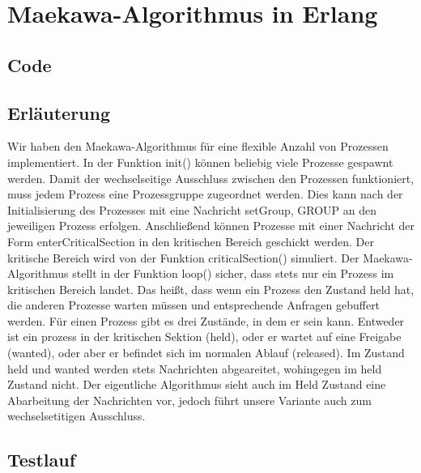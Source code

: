 \documentclass[a4paper,9pt]{article}
\begin{document}
\section{Maekawa-Algorithmus in Erlang}
\subsection{Code}



\vspace{2cm}
\subsection{Erläuterung}
Wir haben den Maekawa-Algorithmus für eine flexible Anzahl von Prozessen implementiert. In der Funktion init() können beliebig viele Prozesse gespawnt werden. Damit der wechselseitige Ausschluss zwischen den Prozessen funktioniert, muss jedem Prozess eine Prozessgruppe zugeordnet werden. Dies kann nach der Initialisierung des Prozesses mit eine Nachricht {setGroup, GROUP} an den jeweiligen Prozess erfolgen. Anschließend können Prozesse mit einer Nachricht der Form enterCriticalSection in den kritischen Bereich geschickt werden. Der kritische Bereich wird von der Funktion criticalSection() simuliert.
Der Maekawa-Algorithmus stellt in der Funktion loop() sicher, dass stets nur ein Prozess im kritischen Bereich landet. Das heißt, dass wenn ein Prozess den Zustand held hat, die anderen Prozesse warten müssen und entsprechende Anfragen gebuffert werden. Für einen Prozess gibt es drei Zustände, in dem er sein kann. Entweder ist ein prozess in der kritischen Sektion (held), oder er wartet auf eine Freigabe (wanted), oder aber er befindet sich im normalen Ablauf (released). Im Zustand held und wanted werden stets Nachrichten abgeareitet, wohingegen im held Zustand nicht. Der eigentliche Algorithmus sieht auch im Held Zustand eine Abarbeitung der Nachrichten vor, jedoch führt unsere Variante auch zum wechselsetitigen Ausschluss.

\pagebreak{}
\subsection{Testlauf}
\end{document}
